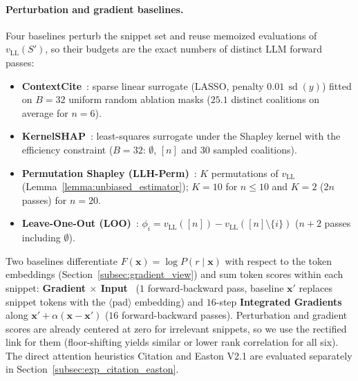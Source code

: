 \paragraph{Perturbation and gradient baselines.}
Four baselines perturb the snippet set and reuse memoized evaluations of $v_{\text{LL}}(S')$, so their budgets are the exact numbers of distinct LLM forward passes:
\begin{itemize}
    \item \textbf{ContextCite}~\cite{cohen2024contextcite}: sparse linear surrogate (LASSO, penalty $0.01\,\operatorname{sd}(y)$) fitted on $B = 32$ uniform random ablation masks ($25.1$ distinct coalitions on average for $n = 6$).
    \item \textbf{KernelSHAP}~\cite{lundberg2017unified}: least-squares surrogate under the Shapley kernel with the efficiency constraint ($B = 32$: $\emptyset$, $[n]$ and $30$ sampled coalitions).
    \item \textbf{Permutation Shapley (LLH-Perm)}~\cite{castro2009polynomial}: $K$ permutations of $v_{\text{LL}}$ (Lemma~\ref{lemma:unbiased_estimator}); $K = 10$ for $n \le 10$ and $K = 2$ ($2n$ passes) for $n = 20$.
    \item \textbf{Leave-One-Out (LOO)}~\cite{liu2025attribot}: $\phi_i = v_{\text{LL}}([n]) - v_{\text{LL}}([n] \setminus \{i\})$ ($n + 2$ passes including $\emptyset$).
\end{itemize}
Two baselines differentiate $F(\mathbf{x}) = \log P(r \mid \mathbf{x})$ with respect to the token embeddings (Section~\ref{subsec:gradient_view}) and sum token scores within each snippet: \textbf{Gradient $\times$ Input}~\cite{simonyan2014deep} ($1$ forward-backward pass, baseline $\mathbf{x}'$ replaces snippet tokens with the $\langle\text{pad}\rangle$ embedding) and $16$-step \textbf{Integrated Gradients}~\cite{sundararajan2017axiomatic} along $\mathbf{x}' + \alpha(\mathbf{x} - \mathbf{x}')$ ($16$ forward-backward passes). Perturbation and gradient scores are already centered at zero for irrelevant snippets, so we use the rectified link for them (floor-shifting yields similar or lower rank correlation for all six). The direct attention heuristics Citation and Easton V2.1 are evaluated separately in Section~\ref{subsec:exp_citation_easton}.


